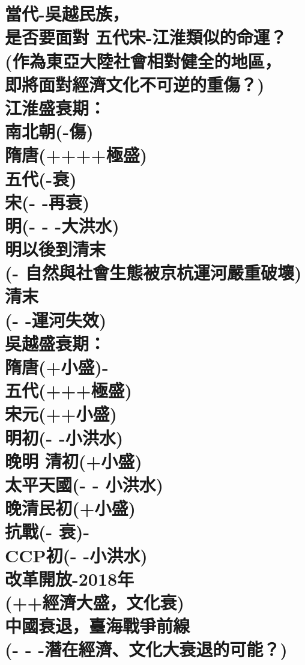 \chapter[當代-吳越民族， 是否要面對 五代宋-江淮類似的命運？ (作為東亞大陸社會相對健全的地區， 即將面對經濟文化不可逆的重傷？) 江淮盛衰期： 南北朝(-傷) 隋唐(++++極盛) 五代(-衰) 宋(- -再衰) 明(- - -大洪水) 明以後到清末 (- 自然與社會生態被京杭運河嚴重破壞) 清末 (- -運河失效) 吳越盛衰期： 隋唐(+小盛)- 五代(+++極盛) 宋元(++小盛) 明初(- -小洪水) 晚明 清初(+小盛) 太平天國(- - 小洪水) 晚清民初(+小盛) 抗戰(- 衰)- CCP初(- -小洪水) 改革開放-2018年 (++經濟大盛，文化衰) 中國衰退，臺海戰爭前線 (- - -潛在經濟、文化大衰退的可能？)]{當代-吳越民族， \\[0.35em] 是否要面對 五代宋-江淮類似的命運？ \\[0.35em] (作為東亞大陸社會相對健全的地區， \\[0.35em] 即將面對經濟文化不可逆的重傷？) \\[0.35em] 江淮盛衰期： \\[0.35em] 南北朝(-傷) \\[0.35em] 隋唐(++++極盛) \\[0.35em] 五代(-衰) \\[0.35em] 宋(- -再衰) \\[0.35em] 明(- - -大洪水) \\[0.35em] 明以後到清末 \\[0.35em] (- 自然與社會生態被京杭運河嚴重破壞) \\[0.35em] 清末 \\[0.35em] (- -運河失效) \\[0.35em] 吳越盛衰期： \\[0.35em] 隋唐(+小盛)- \\[0.35em] 五代(+++極盛) \\[0.35em] 宋元(++小盛) \\[0.35em] 明初(- -小洪水) \\[0.35em] 晚明 清初(+小盛) \\[0.35em] 太平天國(- - 小洪水) \\[0.35em] 晚清民初(+小盛) \\[0.35em] 抗戰(- 衰)- \\[0.35em] CCP初(- -小洪水) \\[0.35em] 改革開放-2018年 \\[0.35em] (++經濟大盛，文化衰) \\[0.35em] 中國衰退，臺海戰爭前線 \\[0.35em] (- - -潛在經濟、文化大衰退的可能？)}

